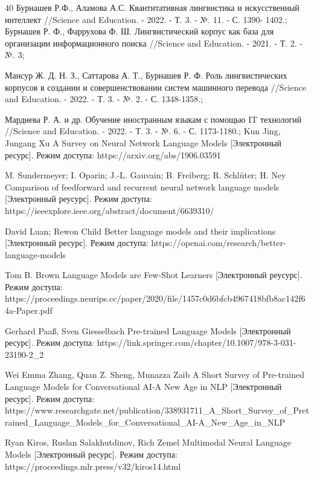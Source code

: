 \documentclass{article}
\begin{document}


\begin{thebibliography} {40}
Бурнашев Р.Ф., Аламова А.С. Квантитативная лингвистика и искусственный интеллект //Science and Education. - 2022. - Т. 3. - №. 11. - С. 1390- 1402.;
 Бурнашев Р. Ф., Фаррухова Ф. Ш. Лингвистический корпус как база для организации информационного поиска //Science and Education. - 2021. - Т. 2. - №. 3;

Мансур Ж. Д. Н. З., Саттарова А. Т., Бурнашев Р. Ф. Роль лингвистических корпусов в создании и совершенствовании систем машинного перевода //Science and Education. - 2022. - Т. 3. - №. 2. - С. 1348-1358.;

Мардиева Р. А. и др. Обучение иностранным языкам с помощью IT технологий //Science and Education. - 2022. - Т. 3. - №. 6. - С. 1173-1180.;
Kun Jing, Jungang Xu A Survey on Neural Network Language Models [Электронный ресурс]. Режим доступа: https://arxiv.org/abs/1906.03591

M. Sundermeyer; I. Oparin; J.-L. Gauvain; B. Freiberg; R. Schlüter; H. Ney Comparison of feedforward and recurrent neural network language models [Электронный реусурс]. Режим доступа: https://ieeexplore.ieee.org/abstract/document/6639310/

 David Luan; Rewon Child Better language models and their implications [Электронный ресурс].
Режим доступа: https://openai.com/research/better-language-models

Tom B. Brown Language Models are Few-Shot Learners [Электронный реусурс]. Режим доступа: 
https://proceedings.neurips.cc/paper/2020/file/1457c0d6bfcb4967418bfb8ac142f64a-Paper.pdf

Gerhard Paaß, Sven Giesselbach Pre-trained Language Models [Электронный ресурс]. Режим доступа: {https://link.springer.com/chapter/10.1007/978-3-031-23190-2\_2}

Wei Emma Zhang, Quan Z. Sheng, Munazza Zaib A Short Survey of Pre-trained Language Models for Conversational AI-A New Age in NLP [Электронный ресурс]. Режим доступа: https://www.researchgate.net/publication/338931711_A_Short_Survey_of_Pretrained_Language_Models_for_Conversational_AI-A_New_Age_in_NLP

Ryan Kiros, Ruslan Salakhutdinov, Rich Zemel Multimodal Neural Language Models [Электронный ресурс]. Режим доступа: https://proceedings.mlr.press/v32/kiros14.html


\end{thebibliography}
\end{document}
